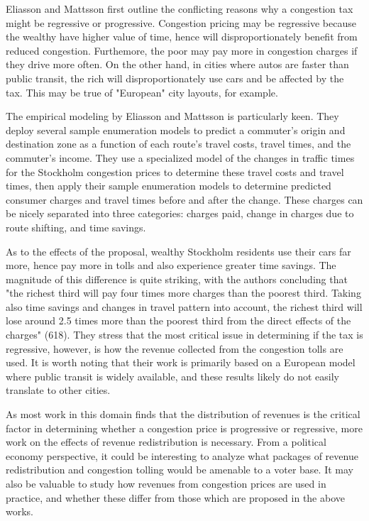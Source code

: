 \documentclass[JEL]{AEA}
\begin{document}
Eliasson and Mattsson first outline the conflicting reasons why a congestion tax might be regressive or progressive. Congestion pricing may be regressive because the wealthy have higher value of time, hence will disproportionately benefit from reduced congestion. Furthemore, the poor may pay more in congestion charges if they drive more often. On the other hand, in cities where autos are faster than public transit, the rich will disproportionately use cars and be affected by the tax. This may be true of "European" city layouts, for example.

The empirical modeling by Eliasson and Mattsson is particularly keen. They deploy several sample enumeration models to predict a commuter's origin and destination zone as a function of each route's travel costs, travel times, and the commuter's income. They use a specialized model of the changes in traffic times for the Stockholm congestion prices to determine these travel costs and travel times, then apply their sample enumeration models to determine predicted consumer charges and travel times before and after the change. These charges can be nicely separated into three categories: charges paid, change in charges due to route shifting, and time savings.

As to the effects of the proposal, wealthy Stockholm residents use their cars far more, hence pay more in tolls and also experience greater time savings. The magnitude of this difference is quite striking, with the authors concluding that "the richest third will pay four times more charges than the poorest third. Taking also time savings and changes in travel pattern into account, the richest third will lose around 2.5 times more than the poorest third from the direct effects of the charges" (618). They stress that the most critical issue in determining if the tax is regressive, however, is how the revenue collected from the congestion tolls are used. It is worth noting that their work is primarily based on a European model where public transit is widely available, and these results likely do not easily translate to other cities.

As most work in this domain finds that the distribution of revenues is the critical factor in determining whether a congestion price is progressive or regressive, more work on the effects of revenue redistribution is necessary. From a political economy perspective, it could be interesting to analyze what packages of revenue redistribution and congestion tolling would be amenable to a voter base. It may also be valuable to study how revenues from congestion prices are used in practice, and whether these differ from those which are proposed in the above works.
\end{document}
